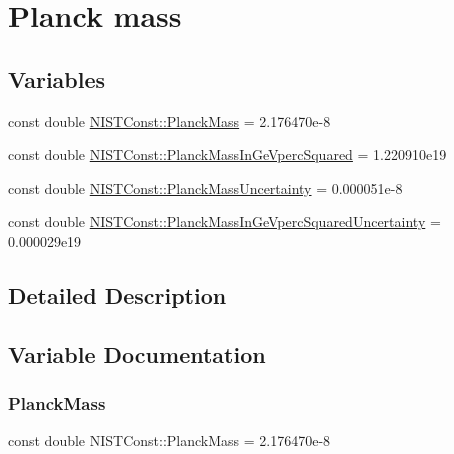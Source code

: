 \hypertarget{group___n_i_s_t_const-_planck_mass}{}\section{Planck mass}
\label{group___n_i_s_t_const-_planck_mass}
\subsection*{Variables}
\begin{DoxyCompactItemize}
\item 
const double \hyperlink{group___n_i_s_t_const-_planck_mass_ga8699da3ffe64687b76fb5f262a63997f}{N\+I\+S\+T\+Const\+::\+Planck\+Mass} = 2.\+176470e-\/8
\item 
const double \hyperlink{group___n_i_s_t_const-_planck_mass_ga71709062f673aeed0bed395299d84a68}{N\+I\+S\+T\+Const\+::\+Planck\+Mass\+In\+Ge\+Vperc\+Squared} = 1.\+220910e19
\item 
const double \hyperlink{group___n_i_s_t_const-_planck_mass_ga500eef372db7d6dcddd4a4a2d3e03b00}{N\+I\+S\+T\+Const\+::\+Planck\+Mass\+Uncertainty} = 0.\+000051e-\/8
\item 
const double \hyperlink{group___n_i_s_t_const-_planck_mass_gaab9eed84a649fb1ee6e90b2e15c86b0a}{N\+I\+S\+T\+Const\+::\+Planck\+Mass\+In\+Ge\+Vperc\+Squared\+Uncertainty} = 0.\+000029e19
\end{DoxyCompactItemize}


\subsection{Detailed Description}


\subsection{Variable Documentation}
\mbox{\label{group___n_i_s_t_const-_planck_mass_ga8699da3ffe64687b76fb5f262a63997f}} 
\subsubsection{\texorpdfstring{Planck\+Mass}{PlanckMass}}
{\footnotesize\ttfamily const double N\+I\+S\+T\+Const\+::\+Planck\+Mass = 2.\+176470e-\/8}

